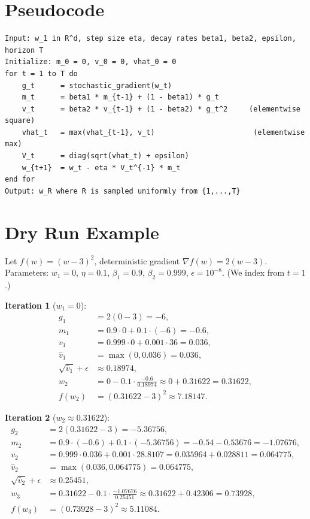 \documentclass[11pt]{article}
\begin{document}
\section*{Pseudocode}

\begin{verbatim}
Input: w_1 in R^d, step size eta, decay rates beta1, beta2, epsilon, horizon T
Initialize: m_0 = 0, v_0 = 0, vhat_0 = 0
for t = 1 to T do
    g_t      = stochastic_gradient(w_t)
    m_t      = beta1 * m_{t-1} + (1 - beta1) * g_t
    v_t      = beta2 * v_{t-1} + (1 - beta2) * g_t^2     (elementwise square)
    vhat_t   = max(vhat_{t-1}, v_t)                       (elementwise max)
    V_t      = diag(sqrt(vhat_t) + epsilon)
    w_{t+1}  = w_t - eta * V_t^{-1} * m_t
end for
Output: w_R where R is sampled uniformly from {1,...,T}
\end{verbatim}

\section*{Dry Run Example}

Let $f(w) = (w-3)^2$, deterministic gradient $\nabla f(w) = 2(w-3)$.
Parameters: $w_1 = 0$, $\eta = 0.1$, $\beta_1 = 0.9$, $\beta_2 = 0.999$,
$\epsilon = 10^{-8}$. (We index from $t=1$.)

\textbf{Iteration 1} ($w_1 = 0$):
\begin{align*}
g_1 &= 2(0-3) = -6,\\
m_1 &= 0.9\cdot 0 + 0.1\cdot(-6) = -0.6,\\
v_1 &= 0.999\cdot 0 + 0.001\cdot 36 = 0.036,\\
\hat v_1 &= \max(0, 0.036) = 0.036,\\
\sqrt{\hat v_1}+\epsilon &\approx 0.18974,\\
w_2 &= 0 - 0.1\cdot\frac{-0.6}{0.18974} \approx 0 + 0.31622 = 0.31622,\\
f(w_2) &= (0.31622-3)^2 \approx 7.18147.
\end{align*}

\textbf{Iteration 2} ($w_2 \approx 0.31622$):
\begin{align*}
g_2 &= 2(0.31622-3) = -5.36756,\\
m_2 &= 0.9\cdot(-0.6) + 0.1\cdot(-5.36756) = -0.54 - 0.53676 = -1.07676,\\
v_2 &= 0.999\cdot 0.036 + 0.001\cdot 28.8107 = 0.035964 + 0.028811 = 0.064775,\\
\hat v_2 &= \max(0.036, 0.064775) = 0.064775,\\
\sqrt{\hat v_2}+\epsilon &\approx 0.25451,\\
w_3 &= 0.31622 - 0.1\cdot\frac{-1.07676}{0.25451} \approx 0.31622 + 0.42306 = 0.73928,\\
f(w_3) &= (0.73928-3)^2 \approx 5.11084.
\end{align*}
\end{document}
